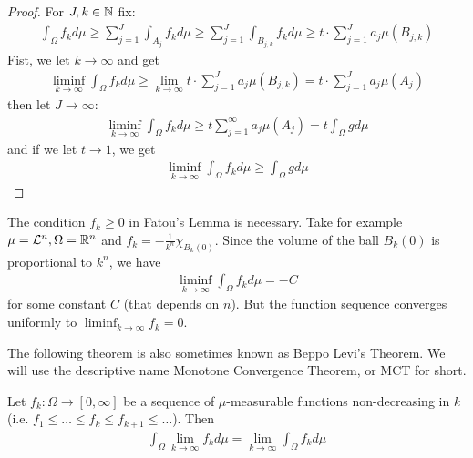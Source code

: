 \begin{proof}
  For $J,k \in \mathbb{N}$ fix:
  \begin{align*}
    \int_{\Omega} f_k d \mu \geq \sum_{j=1}^{J} \int_{A_j} f_k d \mu \geq \sum_{j=1}^{J} \int_{B_{j,k}} f_k d \mu \geq t \cdot \sum_{j=1}^{J}a_j \mu(B_{j,k})
  \end{align*}
  Fist, we let $k \to \infty$ and get
  \begin{align*}
    \liminf_{k \to \infty} \int_{\Omega} f_k d \mu \geq \lim_{k \to \infty}t \cdot \sum_{j=1}^{J}a_j \mu(B_{j,k}) = t \cdot \sum_{j=1}^{J}a_j \mu(A_j)
  \end{align*}
  then let $J \to \infty$:
  \begin{align*}
    \liminf_{k \to \infty} \int_{\Omega} f_k d \mu \geq t \sum_{j=1}^{\infty}a_j \mu(A_j) = t \int_{\Omega} g d \mu
  \end{align*}
  and if we let $t \to 1$, we get
  \begin{align*}
    \liminf_{k \to \infty} \int_{\Omega} f_k d \mu \geq \int_{\Omega} g d \mu
  \end{align*}
\end{proof}


\begin{ex}[]
The condition $f_k \geq 0$ in Fatou's Lemma is necessary. 
Take for example $\mu = \mathcal{L}^{n}, \Omega = \mathbb{R}^{n}$ and $f_k = - \frac{1}{k^{n}} \chi_{B_k(0)}$.
Since the volume of the ball $B_{k}(0)$ is proportional to $k^{n}$, we have
\begin{align*}
  \liminf_{k \to \infty} \int_{\Omega} f_k d \mu = - C
\end{align*}
for some constant $C$ (that depends on $n$).
But the function sequence converges uniformly to $\liminf_{k \to \infty}f_k = 0$.
\end{ex}


The following theorem is also sometimes known as Beppo Levi's Theorem. We will use the descriptive name Monotone Convergence Theorem, or MCT for short.
\begin{thm}
  Let $f_k: \Omega \to [0,\infty]$ be a sequence of $\mu$-measurable functions non-decreasing in $k$ (i.e. $f_1 \leq \ldots \leq f_k \leq f_{k+1} \leq \ldots$).
  Then
  \begin{align*}
    \int_{\Omega} \lim_{k \to \infty}f_k d \mu = \lim_{k \to \infty} \int_{\Omega} f_k d \mu
  \end{align*}
\end{thm}

